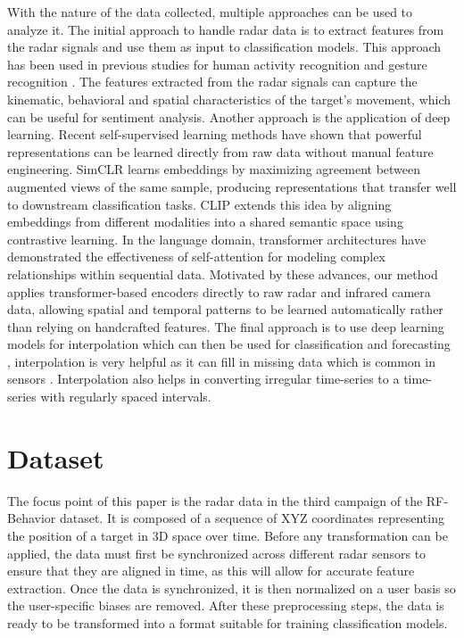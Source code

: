 \documentclass{article}
\begin{document}
With the nature of the data collected, multiple approaches can be used to analyze it. The initial approach to handle radar data is to extract features from the radar signals and use them as input to classification models. This approach has been used in previous studies for human activity recognition \cite{radardetection2018} and gesture recognition \cite{radargesture2020}. The features extracted from the radar signals can capture the kinematic, behavioral and spatial characteristics of the target's movement, which can be useful for sentiment analysis. Another approach is the application of deep learning. Recent self-supervised learning methods have shown that powerful representations can be learned directly from raw data without manual feature engineering. SimCLR \cite{chen2020simple} learns embeddings by maximizing agreement between augmented views of the same sample, producing representations that transfer well to downstream classification tasks. CLIP \cite{radford2021learning} extends this idea by aligning embeddings from different modalities into a shared semantic space using contrastive learning. In the language domain, transformer architectures \cite{vaswani2017attention} have demonstrated the effectiveness of self-attention for modeling complex relationships within sequential data. Motivated by these advances, our method applies transformer-based encoders directly to raw radar and infrared camera data, allowing spatial and temporal patterns to be learned automatically rather than relying on handcrafted features. The final approach is to use deep learning models for interpolation which can then be used for classification and forecasting \cite{jhin2022exitextrapolationinterpolationbasedneural}, interpolation is very helpful as it can fill in missing data which is common in sensors \cite{10.1108/IMDS-08-2022-0468}. Interpolation also helps in converting irregular time-series to a time-series with regularly spaced intervals.

\section{Dataset}

The focus point of this paper is the radar data in the third campaign of the RF-Behavior dataset. It is composed of a sequence of XYZ coordinates representing the position of a target in 3D space over time. Before any transformation can be applied, the data must first be synchronized across different radar sensors to ensure that they are aligned in time, as this will allow for accurate feature extraction. Once the data is synchronized, it is then normalized on a user basis so the user-specific biases are removed. After these preprocessing steps, the data is ready to be transformed into a format suitable for training classification models.
\end{document}
